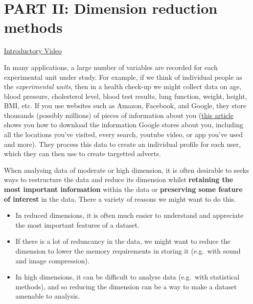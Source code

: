 \documentclass[]{book}
\providecommand{\tightlist}{%
  \setlength{\itemsep}{0pt}\setlength{\parskip}{0pt}}
\theoremstyle{definition}
\theoremstyle{definition}
\theoremstyle{definition}
\theoremstyle{remark}
\begin{document}
\hypertarget{part-ii-dimension-reduction-methods}{%
\chapter*{PART II: Dimension reduction methods}\label{part-ii-dimension-reduction-methods}}

\href{https://mediaspace.nottingham.ac.uk/media/Part+IIA+Dimension+reduction+introduction/1_0s2cgr1r}{Introductory Video}

In many applications, a large number of variables are recorded for each experimental unit under study. For example, if we think of individual people as the \emph{experimental units}, then in a health check-up we might collect data on age, blood pressure, cholesterol level, blood test results, lung function, weight, height, BMI, etc. If you use websites such as Amazon, Facebook, and Google, they store thousands (possibly millions) of pieces of information about you (\href{https://www.theguardian.com/commentisfree/2018/mar/28/all-the-data-facebook-google-has-on-you-privacy}{this article} shows you how to download the information Google stores about you, including all the locations you've visited, every search, youtube video, or app you've used and more). They process this data to create an individual profile for each user, which they can then use to create targetted adverts.

When analysing data of moderate or high dimension, it is often desirable to seeks ways to restructure the data and reduce its dimension whilst \textbf{retaining the most important information} within the data or \textbf{preserving some feature of interest} in the data. There a variety of reasons we might want to do this.

\begin{itemize}
\tightlist
\item
  In reduced dimensions, it is often much easier to understand and appreciate the most important features of a dataset.
\item
  If there is a lot of reduncancy in the data, we might want to reduce the dimension to lower the memory requirements in storing it (e.g.~with sound and image compression).
\item
  In high dimensions, it can be difficult to analyse data (e.g.~with statistical methods), and so reducing the dimension can be a way to make a dataset amenable to analysis.
\end{itemize}
\end{document}

